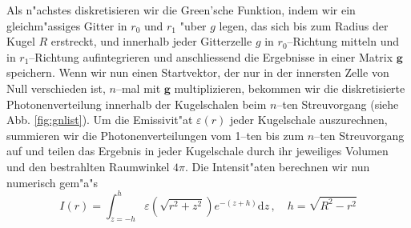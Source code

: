 	Als n"achstes diskretisieren wir die Green'sche Funktion, indem wir ein gleichm"assiges Gitter in $r_0$ und $r_1$ "uber $g$ legen, das sich bis zum Radius der Kugel $R$ erstreckt, und innerhalb jeder Gitterzelle $g$ in $r_0$--Richtung mitteln und in $r_1$--Richtung aufintegrieren und anschliessend die Ergebnisse in einer Matrix $\mathbf{g}$ speichern. Wenn wir nun einen Startvektor, der nur in der innersten Zelle von Null verschieden ist, $n$--mal mit $\mathbf{g}$ multiplizieren, bekommen wir die diskretisierte Photonenverteilung innerhalb der Kugelschalen beim $n$--ten Streuvorgang (siehe Abb. \ref{fig:gnlist}). Um die Emissivit"at $\varepsilon(r)$ jeder Kugelschale auszurechnen, summieren wir die Photonenverteilungen vom 1--ten bis zum $n$--ten Streuvorgang auf und teilen das Ergebnis in jeder Kugelschale durch ihr jeweiliges Volumen und den bestrahlten Raumwinkel $4\pi$. Die Intensit"aten berechnen wir nun numerisch gem"a"s
	\begin{equation}
		I(r) = \int_{z=-h}^h \varepsilon\left(\sqrt{r^2+z^2}\right) e^{-(z+h)}\text{d}z\,,\quad h=\sqrt{R^2-r^2}
		\label{eq:testprob_intensity_calculation}
	\end{equation}
	
	
	
	\pagebreak
